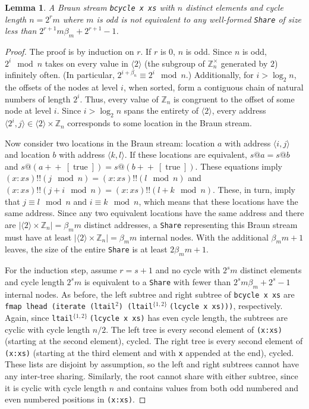 \documentclass[envcountsect]{llncs}
\DeclareMathOperator{\true}{true}
\newcommand{\app}{+\!\!\!+\ }
\newcommand{\share}{{\tt Share} }
\newtheorem{lemma}[theorem]{Lemma}
\begin{document}
\begin{lemma}
\label{cycleSizeMin}
A Braun stream {\tt bcycle x xs} with $n$ distinct elements and cycle length $n = 2^r m$ where $m$ is odd is not equivalent to any well-formed \share of size less than $2^{r+1} m \beta_m + 2^{r+1} - 1$.
\end{lemma}
\begin{proof}

The proof is by induction on $r$.
If $r$ is $0$, $n$ is odd.
Since $n$ is odd, $2^i \mod n$ takes on every value in $\langle 2 \rangle$ (the subgroup of $\mathbb{Z}_n^{\times}$ generated by $2$) infinitely often.
(In particular, $2^{i+\beta_n} \equiv 2^i \mod n$.)
Additionally, for $i > \log_2 n$, the offsets of the nodes at level $i$, when sorted, form a contiguous chain of natural numbers of length $2^i$.
Thus, every value of $\mathbb{Z}_n$ is congruent to the offset of some node at level $i$.
Since $i > \log_2 n$ spans the entirety of $\langle 2 \rangle$, every address $\langle 2^i,j \rangle \in \langle 2 \rangle \times \mathbb{Z}_n$ corresponds to some location in the Braun stream.

Now consider two locations in the Braun stream: location $a$ with address $\langle i,j \rangle$ and location $b$ with address $\langle k,l \rangle$.
If these locations are equivalent, $s@a = s@b$ and $s@(a \app [\true]) = s@(b \app [\true])$.
These equations imply $(x:xs) !! (j\mod n) = (x:xs) !! (l\mod n)$ and $(x:xs) !! (j+i\mod n) = (x:xs) !! (l+k\mod n)$.
These, in turn, imply that $j \equiv l \mod n$ and $i \equiv k \mod n$, which means that these locations have the same address.
Since any two equivalent locations have the same address and there are $|\langle 2 \rangle \times \mathbb{Z}_n| = \beta_m m$ distinct addresses, a \share representing this Braun stream must have at least $|\langle 2 \rangle \times \mathbb{Z}_n| = \beta_m m$ internal nodes.
With the additional $\beta_m m + 1$ leaves, the size of the entire \share is at least $2 \beta_m m + 1$.

For the induction step, assume $r = s+1$ and no cycle with $2^s m$ distinct elements and cycle length $2^s m$ is equivalent to a \share with fewer than $2^s m \beta_m + 2^s - 1$ internal nodes.
As before, the left subtree and right subtree of {\tt bcycle x xs} are {\tt fmap lhead (iterate (ltail}$^2${\tt ) (ltail}$^{\{1,2\}}\ ${\tt (lcycle x xs)))}, respectively.
Again, since {\tt ltail}$^{\{1,2\}}\ ${\tt (lcycle x xs)} has even cycle length, the subtrees are cyclic with cycle length $n/2$.
The left tree is every second element of {\tt (x:xs)} (starting at the second element), cycled.
The right tree is every second element of {\tt (x:xs)} (starting at the third element and with {\tt x} appended at the end), cycled.
These lists are disjoint by assumption, so the left and right subtrees cannot have any inter-tree sharing.
Similarly, the root cannot share with either subtree, since it is cyclic with cycle length $n$ and contains values from both odd numbered and even numbered positions in {\tt (x:xs)}.


\end{proof}
\end{document}
